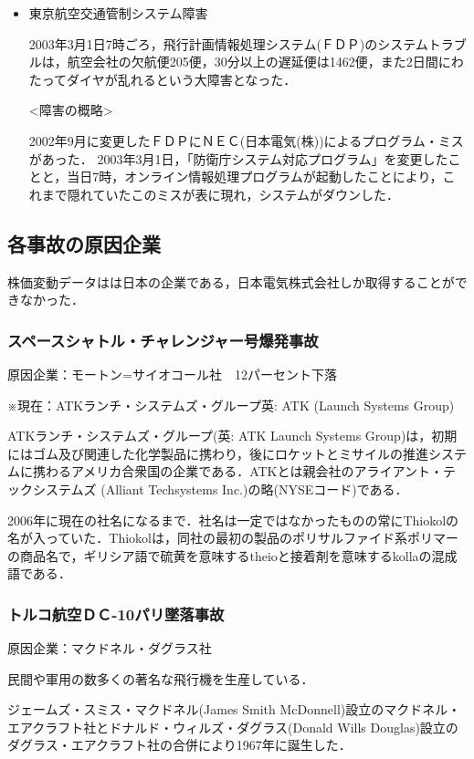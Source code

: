 {\begin{itemize}
  \item 東京航空交通管制システム障害

2003年3月1日7時ごろ，飛行計画情報処理システム(ＦＤＰ)のシステムトラブルは，航空会社の欠航便205便，30分以上の遅延便は1462便，また2日間にわたってダイヤが乱れるという大障害となった．

<障害の概略>
 
2002年9月に変更したＦＤＰにＮＥＣ(日本電気(株))によるプログラム・ミスがあった．
2003年3月1日，「防衛庁システム対応プログラム」を変更したことと，当日7時，オンライン情報処理プログラムが起動したことにより，これまで隠れていたこのミスが表に現れ，システムがダウンした\cite{kouku}．

\end{itemize}

\subsection{各事故の原因企業}
株価変動データはは日本の企業である，日本電気株式会社しか取得することができなかった．

\subsubsection{スペースシャトル・チャレンジャー号爆発事故}
原因企業：モートン=サイオコール社　12パーセント下落\cite{miyake2}

※現在：ATKランチ・システムズ・グループ英: ATK (Launch Systems Group)  

ATKランチ・システムズ・グループ(英: ATK Launch Systems Group)は，初期にはゴム及び関連した化学製品に携わり，後にロケットとミサイルの推進システムに携わるアメリカ合衆国の企業である．ATKとは親会社のアライアント・テックシステムズ (Alliant Techsystems Inc.)の略(NYSEコード)である．

2006年に現在の社名になるまで．社名は一定ではなかったものの常にThiokolの名が入っていた．Thiokolは，同社の最初の製品のポリサルファイド系ポリマーの商品名で，ギリシア語で硫黄を意味するtheioと接着剤を意味するkollaの混成語である\cite{saiokoru}．

\subsubsection{トルコ航空ＤＣ-10パリ墜落事故}
原因企業：マクドネル・ダグラス社　　　　　

民間や軍用の数多くの著名な飛行機を生産している．

ジェームズ・スミス・マクドネル(James Smith McDonnell)設立のマクドネル・エアクラフト社とドナルド・ウィルズ・ダグラス(Donald Wills Douglas)設立のダグラス・エアクラフト社の合併により1967年に誕生した．

}
